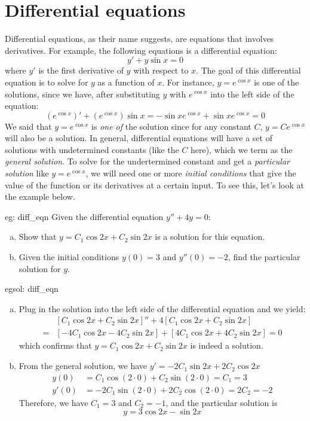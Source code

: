 \section{Differential equations}
Differential equations, as their name suggests, are equations that involves derivatives.  For example, the following equations is a differential equation:
\[y' + y\sin x = 0\]
where $y'$ is the first derivative of $y$ with respect to $x$.  The goal of this differential equation is to solve for $y$ as a function of $x$.  For instance, $y = e^{\cos x}$ is one of the solutions, since we have, after substituting $y$ with $e^{\cos x}$ into the left side of the equation:
\[(e^{\cos x})' + (e^{\cos x})\sin x = -\sin x e^{\cos x} + \sin x e^{\cos x} = 0\]
We said that $y = e^{\cos x}$ is \textit{one of} the solution since for any constant $C$, $y = Ce^{\cos x}$ will also be a solution.  In general, differential equations will have a set of solutions with undetermined constants (like the $C$ here), which we term as the \textit{general solution}.  To solve for the undertermined constant and get a \textit{particular solution} like $y = e^{\cos x}$, we will need one or more \textit{initial conditions} that give the value of the function or its derivatives at a certain input.  To see this, let's look at the example below.

\begin{eg}[]{eg: diff_eqn}
    Given the differential equation $y'' + 4y = 0$:
    \begin{enumerate}[a)]
        \item Show that $y = C_1\cos 2x + C_2\sin 2x$ is a solution for this equation.
        \item Given the initial conditions $y(0) = 3$ and $y''(0) = -2$, find the particular solution for $y$.
    \end{enumerate}
\end{eg}

\begin{egsol}[]{egsol: diff_eqn}
    \begin{enumerate}[a)]
        \item Plug in the solution into the left side of the differential equation and we yield:
        \begin{align*}
            &[C_1\cos 2x + C_2\sin 2x]''+ 4[C_1\cos 2x + C_2\sin 2x]\\
            =&[-4C_1\cos 2x -4C_2\sin 2x] + [4C_1\cos 2x + 4C_2\sin 2x]= 0
        \end{align*}
        which confirms that $y = C_1\cos 2x + C_2\sin 2x$ is indeed a solution.
        \item From the general solution, we have $y' = -2C_1 \sin 2x + 2C_2 \cos 2x$
        \begin{align*}
            y(0) &= C_1 \cos (2 \cdot 0) + C_2 \sin (2 \cdot 0) = C_1 = 3 \\
            y'(0) &= -2 C_1 \sin (2 \cdot 0) + 2 C_2 \cos (2 \cdot 0) = 2C_2 = -2
        \end{align*}
        Therefore, we have $C_1 = 3$ and $C_2 = -1$, and the particular solution is
        \[y = 3\cos 2x -\sin 2x\]
    \end{enumerate}
\end{egsol}

